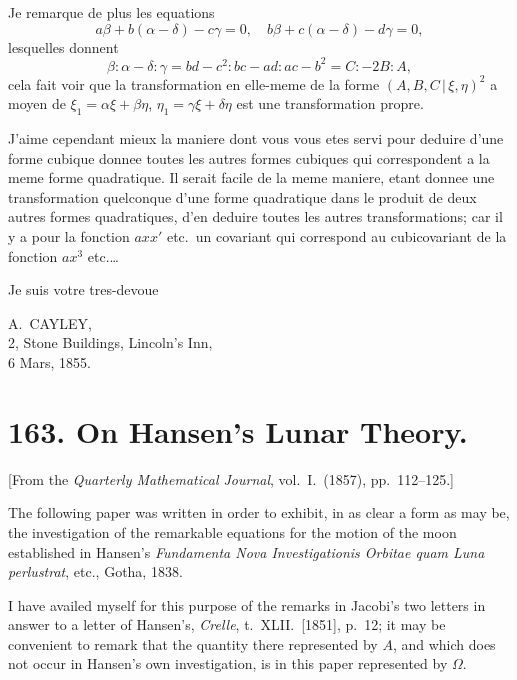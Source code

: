 \documentclass[11pt,a4paper]{book}
\begin{document}
Je remarque de plus les equations
\[
a\beta + b(\alpha-\delta) - c\gamma = 0, \quad b\beta + c(\alpha-\delta) - d\gamma = 0,
\]
lesquelles donnent
\[
\beta : \alpha-\delta : \gamma = bd-c^2 : bc-ad : ac-b^2 = C : -2B : A,
\]
cela fait voir que la transformation en elle-meme de la forme $(A,B,C \,|\, \xi,\eta)^2$ a moyen de $\xi_1 = \alpha\xi + \beta\eta$, $\eta_1 = \gamma\xi + \delta\eta$ est une transformation propre.

J'aime cependant mieux la maniere dont vous vous etes servi pour deduire d'une forme cubique donnee toutes les autres formes cubiques qui correspondent a la meme forme quadratique. Il serait facile de la meme maniere, etant donnee une transformation quelconque d'une forme quadratique dans le produit de deux autres formes quadratiques, d'en deduire toutes les autres transformations; car il y a pour la fonction $axx'$ etc.\ un covariant qui correspond au cubicovariant de la fonction $ax^3$ etc.\ldots

Je suis votre tres-devoue

\begin{flushright}
A.~CAYLEY,\\
2, Stone Buildings, Lincoln's Inn,\\
6 Mars, 1855.
\end{flushright}

\clearpage

\section*{163. On Hansen's Lunar Theory.}

[From the \textit{Quarterly Mathematical Journal}, vol.~I.\ (1857), pp.~112--125.]

The following paper was written in order to exhibit, in as clear a form as may be, the investigation of the remarkable equations for the motion of the moon established in Hansen's \textit{Fundamenta Nova Investigationis Orbitae quam Luna perlustrat}, etc., Gotha, 1838.

I have availed myself for this purpose of the remarks in Jacobi's two letters in answer to a letter of Hansen's, \textit{Crelle}, t.~XLII.\ [1851], p.~12; it may be convenient to remark that the quantity there represented by $A$, and which does not occur in Hansen's own investigation, is in this paper represented by $\Omega$.
\end{document}

